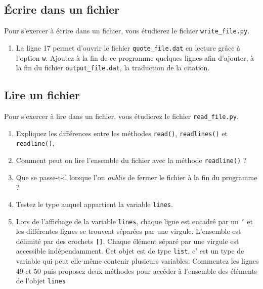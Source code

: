 
\subsection{Écrire dans un fichier}

Pour s'exercer à écrire dans un fichier, vous étudierez le fichier \texttt{write\_file.py}.

\begin{enumerate}

\item La ligne 17 permet d'ouvrir le fichier \texttt{quote\_file.dat} en lecture grâce
  à l'option \texttt{w}.
  Ajoutez à la fin de ce programme quelques lignes afin d'ajouter, à la fin du
  fichier \texttt{output\_file.dat}, la traduction de la citation.

\end{enumerate}

\subsection{Lire un fichier}

Pour s'exercer à lire dans un fichier, vous étudierez le fichier \texttt{read\_file.py}.

\begin{enumerate}

\item Expliquez les différences entre les méthodes \texttt{read()},
  \texttt{readlines()} et \texttt{readline()},

\item Comment peut on lire l'ensemble du fichier avec la méthode \texttt{readline()} ?

\item Que se passe-t-il lorsque l'on \textit{oublie} de fermer le fichier à la fin du programme ?

\item Testez le type auquel appartient la variable \texttt{lines}.

\item Lors de l'affichage de la variable \texttt{lines}, chaque ligne est encadré par un \texttt{'} et
  les différentes lignes se trouvent séparées par une virgule. L'ensemble est délimité par des crochets \texttt{[]}.
  Chaque élément séparé par une virgule est accessible indépendamment.
  Cet objet est de type \texttt{list}, c' est un type de variable qui peut elle-même contenir plusieurs variables.
  Commentez les lignes 49 et 50 puis proposez deux méthodes pour accéder à l'ensemble des éléments de l'objet \texttt{lines}

\end{enumerate}

